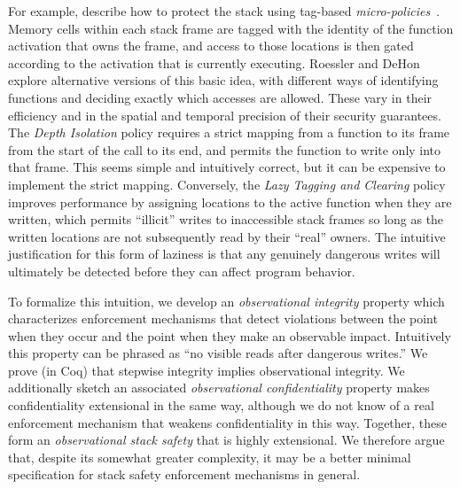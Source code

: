 \documentclass[acmsmall,review,anonymous]{acmart}\settopmatter{printfolios=true,printccs=false,printacmref=false}
\begin{document}
For example, \citet{DBLP:conf/sp/RoesslerD18} describe how to protect the stack
using tag-based \emph{micro-policies}~\citep{pump_oakland2015}.
Memory cells within each stack frame are tagged with the
identity of the function activation
that owns the frame, and access to those locations is then gated
according to the activation that is currently executing. Roessler and DeHon
explore alternative versions of this basic idea, with different ways of identifying
functions and deciding exactly which accesses are allowed.
These vary in their efficiency and in the spatial and temporal precision of their
security guarantees.
The \emph{Depth Isolation} policy requires a strict mapping from a function
to its frame from the start of the call to its end, and permits the function to write
only into that frame.
This seems simple and intuitively correct, but it can be expensive to implement the strict
mapping. Conversely, the \emph{Lazy Tagging and Clearing} policy improves
performance by assigning locations to the active function when they are written, which
permits  ``illicit'' writes to inaccessible stack frames so long as the
written locations are not subsequently read by their ``real'' owners. The intuitive justification
for this form of laziness is that any genuinely dangerous writes will ultimately be
detected before they can affect program behavior.

To formalize this intuition, we develop an \emph{observational integrity} property which
characterizes enforcement mechanisms that detect violations between the point when
they occur and the point when they make an observable impact. Intuitively this property
can be phrased as ``no visible reads after dangerous writes.''  We prove (in Coq) that stepwise
integrity implies observational integrity.
We additionally sketch an associated {\em observational confidentiality} property
makes confidentiality extensional in the same way, although we do not know of a real
enforcement mechanism that weakens confidentiality in this way.
Together, these form an {\em observational stack safety} that is highly extensional.
We therefore argue that, despite its somewhat greater complexity,
it may be a better minimal specification for
stack safety enforcement mechanisms in general.
\end{document}
